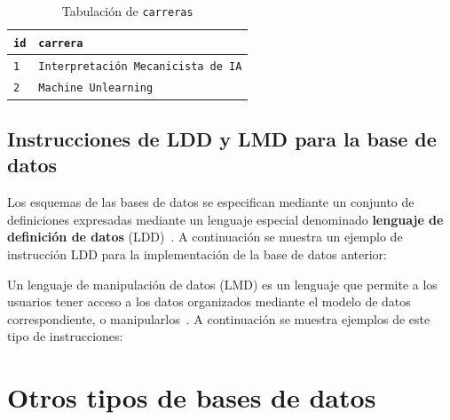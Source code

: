 \documentclass[12pt]{article}
\begin{document}
\begin{table}[h!]
	\begin{center}
		\begin{tabular}{p{7.255cm}|p{7.255cm}}
			\hline
			\textbf{\texttt{id}} & \textbf{\texttt{carrera}} \\
			\hline
			\texttt{1} & \texttt{Interpretación Mecanicista de IA} \\
			\texttt{2} & \texttt{Machine Unlearning} \\
			\hline
		\end{tabular}
		\caption{Tabulación de \texttt{carreras}}
		\label{tab:carreras}
	\end{center}
\end{table}

\subsection*{Instrucciones de LDD y LMD para la base de datos}

Los esquemas de las bases de datos se especifican mediante un conjunto de definiciones expresadas mediante un lenguaje especial denominado \textbf{lenguaje de definición de datos} (LDD)~\cite{Silberschatz2014}. A continuación se muestra un ejemplo de instrucción LDD para la implementación de la base de datos anterior:



Un lenguaje de manipulación de datos (LMD) es un lenguaje que permite a los usuarios tener acceso a los datos organizados mediante el modelo de datos correspondiente, o manipularlos~\cite{Silberschatz2014}. A continuación se muestra ejemplos de este tipo de instrucciones:




\section*{Otros tipos de bases de datos}
\end{document}
